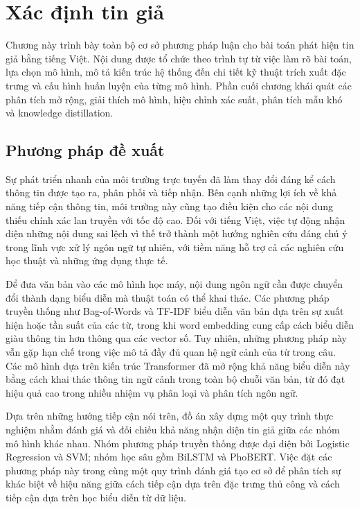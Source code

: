 %

\chapter{Xác định tin giả}

Chương này trình bày toàn bộ cơ sở phương pháp luận cho bài toán phát hiện tin giả bằng tiếng Việt. Nội dung được tổ chức theo trình tự từ việc làm rõ bài toán, lựa chọn mô hình, mô tả kiến trúc hệ thống đến chi tiết kỹ thuật trích xuất đặc trưng và cấu hình huấn luyện của từng mô hình. Phần cuối chương khái quát các phân tích mở rộng, giải thích mô hình, hiệu chỉnh xác suất, phân tích mẫu khó và knowledge distillation.

\section{Phương pháp đề xuất}

Sự phát triển nhanh của môi trường trực tuyến đã làm thay đổi đáng kể cách thông tin được tạo ra, phân phối và tiếp nhận. Bên cạnh những lợi ích về khả năng tiếp cận thông tin, môi trường này cũng tạo điều kiện cho các nội dung thiếu chính xác lan truyền với tốc độ cao. Đối với tiếng Việt, việc tự động nhận diện những nội dung sai lệch vì thế trở thành một hướng nghiên cứu đáng chú ý trong lĩnh vực xử lý ngôn ngữ tự nhiên, với tiềm năng hỗ trợ cả các nghiên cứu học thuật và những ứng dụng thực tế.

Để đưa văn bản vào các mô hình học máy, nội dung ngôn ngữ cần được chuyển đổi thành dạng biểu diễn mà thuật toán có thể khai thác. Các phương pháp truyền thống như Bag-of-Words và TF-IDF biểu diễn văn bản dựa trên sự xuất hiện hoặc tần suất của các từ, trong khi word embedding cung cấp cách biểu diễn giàu thông tin hơn thông qua các vector số. Tuy nhiên, những phương pháp này vẫn gặp hạn chế trong việc mô tả đầy đủ quan hệ ngữ cảnh của từ trong câu. Các mô hình dựa trên kiến trúc Transformer đã mở rộng khả năng biểu diễn này bằng cách khai thác thông tin ngữ cảnh trong toàn bộ chuỗi văn bản, từ đó đạt hiệu quả cao trong nhiều nhiệm vụ phân loại và phân tích ngôn ngữ.

Dựa trên những hướng tiếp cận nói trên, đồ án xây dựng một quy trình thực nghiệm nhằm đánh giá và đối chiếu khả năng nhận diện tin giả giữa các nhóm mô hình khác nhau. Nhóm phương pháp truyền thống được đại diện bởi Logistic Regression và SVM; nhóm học sâu gồm BiLSTM và PhoBERT. Việc đặt các phương pháp này trong cùng một quy trình đánh giá tạo cơ sở để phân tích sự khác biệt về hiệu năng giữa cách tiếp cận dựa trên đặc trưng thủ công và cách tiếp cận dựa trên học biểu diễn từ dữ liệu.

